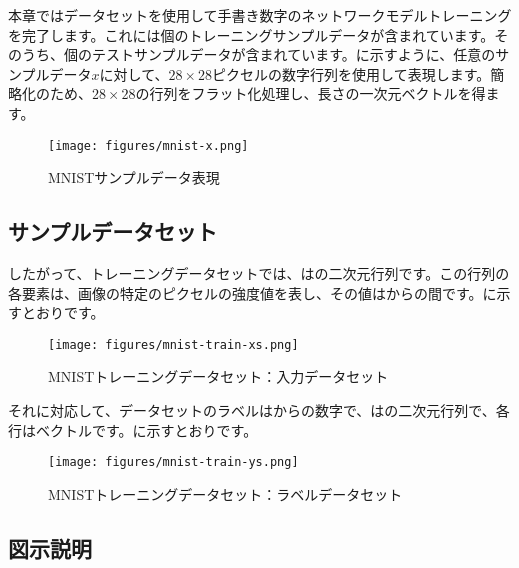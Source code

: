 \begin{content}

本章ではデータセットを使用して手書き数字のネットワークモデルトレーニングを完了します。これには個のトレーニングサンプルデータが含まれています。そのうち、個のテストサンプルデータが含まれています。に示すように、任意のサンプルデータ$x$に対して、$28 \times 28$ピクセルの数字行列を使用して表現します。簡略化のため、$28 \times 28$の行列をフラット化処理し、長さの一次元ベクトルを得ます。

\begin{figure}[H]
\centering
\texttt{[image: figures/mnist-x.png]}
\caption{MNISTサンプルデータ表現}
 \label{fig:mnist-x}
\end{figure}

\subsection{サンプルデータセット}

したがって、トレーニングデータセットでは、は\code{[60000, 784]}の二次元行列です。この行列の各要素は、画像の特定のピクセルの強度値を表し、その値はからの間です。に示すとおりです。

\begin{figure}[H]
\centering
\texttt{[image: figures/mnist-train-xs.png]}
\caption{MNISTトレーニングデータセット：入力データセット}
 \label{fig:mnist-train-xs}
\end{figure}

それに対応して、データセットのラベルはからの数字で、は\code{[60000, 10]}の二次元行列で、各行はベクトルです。に示すとおりです。

\begin{figure}[H]
\centering
\texttt{[image: figures/mnist-train-ys.png]}
\caption{MNISTトレーニングデータセット：ラベルデータセット}
 \label{fig:mnist-train-ys}
\end{figure}

\subsection{図示説明}

\begin{content}


\end{content}
\end{content}
